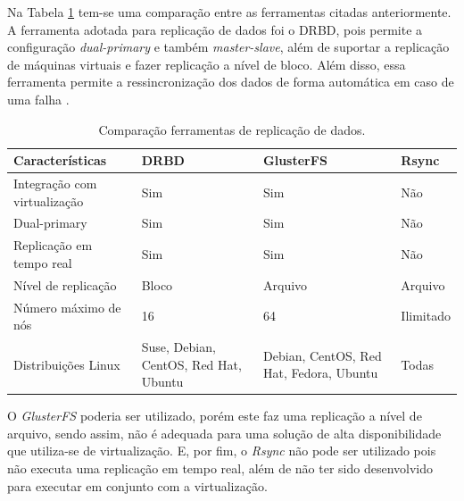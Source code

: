 Na Tabela \ref{tab:replicacao} tem-se uma comparação entre as ferramentas citadas anteriormente. 
A ferramenta adotada para replicação de dados foi o \ac{DRBD}, pois permite a configuração \textit{dual-primary} e também \textit{master-slave}, 
além de suportar a replicação de máquinas virtuais e fazer replicação a nível de bloco. Além disso, essa ferramenta permite a ressincronização 
dos dados de forma automática em caso de uma falha \cite{drbd}.

\begin{table}[h!]
\caption{Comparação ferramentas de replicação de dados.}
\label{tab:replicacao}
\begin{center}
\begin{tabular}{|l|p{3.5cm}|p{3.5cm}|p{2cm}|}\hline
\textbf{Características} & \textbf{DRBD} & \textbf{GlusterFS} & \textbf{Rsync} \\\hline
Integração com virtualização & Sim & Sim & Não \\\hline
Dual-primary & Sim & Sim & Não \\\hline
Replicação em tempo real & Sim & Sim & Não \\\hline
Nível de replicação & Bloco & Arquivo & Arquivo \\\hline
Número máximo de nós & 16 & 64 & Ilimitado \\\hline
Distribuições Linux & Suse, Debian, CentOS, Red Hat, Ubuntu & Debian, CentOS, Red Hat, Fedora, Ubuntu & Todas \\\hline
\end{tabular}
\end{center}
\end{table}

O \textit{GlusterFS} poderia ser utilizado, porém este faz uma replicação a nível de arquivo, sendo assim, não é adequada para uma 
solução de alta disponibilidade que utiliza-se de virtualização. 
E, por fim, o \textit{Rsync} não pode ser utilizado pois não executa uma replicação em tempo real, além de não ter sido desenvolvido para
executar em conjunto com a virtualização.




